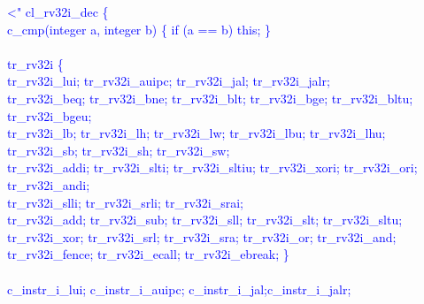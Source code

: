\textcolor{blue}{
\noindent \textless" cl\_rv32i\_dec \{\\%
\indent c\_cmp(integer a, integer b) \{ if (a == b) this; \}\\%
	\\
\indent tr\_rv32i \{ \\%
\indent \indent tr\_rv32i\_lui; \space tr\_rv32i\_auipc; \space tr\_rv32i\_jal; \space tr\_rv32i\_jalr; \\%
\indent \indent tr\_rv32i\_beq; \space tr\_rv32i\_bne; \space tr\_rv32i\_blt; \space tr\_rv32i\_bge; \space tr\_rv32i\_bltu; \space tr\_rv32i\_bgeu; \\%
\indent \indent tr\_rv32i\_lb; \space tr\_rv32i\_lh; \space tr\_rv32i\_lw; \space tr\_rv32i\_lbu; \space tr\_rv32i\_lhu; \\%
\indent \indent tr\_rv32i\_sb; \space tr\_rv32i\_sh; \space tr\_rv32i\_sw; \\%
\indent \indent tr\_rv32i\_addi; \space tr\_rv32i\_slti; \space tr\_rv32i\_sltiu; \space tr\_rv32i\_xori; \space tr\_rv32i\_ori; \space tr\_rv32i\_andi; \\%
\indent \indent tr\_rv32i\_slli; \space tr\_rv32i\_srli; \space tr\_rv32i\_srai; \\%
\indent \indent tr\_rv32i\_add; \space tr\_rv32i\_sub; \space tr\_rv32i\_sll; \space tr\_rv32i\_slt; \space tr\_rv32i\_sltu; \\%
\indent \indent tr\_rv32i\_xor; \space tr\_rv32i\_srl; \space tr\_rv32i\_sra; \space tr\_rv32i\_or; \space tr\_rv32i\_and; \\%
\indent \indent tr\_rv32i\_fence; tr\_rv32i\_ecall; tr\_rv32i\_ebreak; \} \\%
\\
\indent c\_instr\_i\_lui; \space c\_instr\_i\_auipc; \space c\_instr\_i\_jal;\space c\_instr\_i\_jalr;\\%
}
